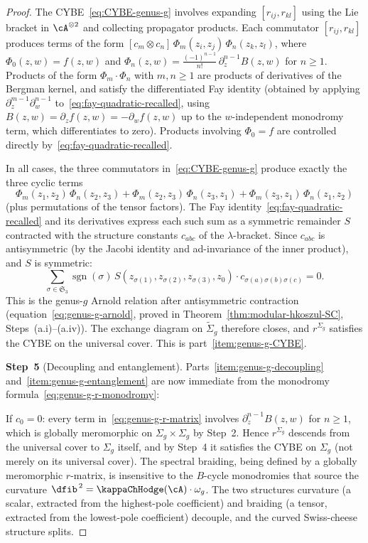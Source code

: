 \begin{proof}
The CYBE~\eqref{eq:CYBE-genus-g} involves expanding $[r_{ij},
r_{kl}]$ using the Lie bracket in $\cA^{\otimes 2}$ and collecting
propagator products. Each commutator $[r_{ij}, r_{kl}]$ produces
terms of the form
$[c_m \otimes c_n]\, \Phi_m(z_i, z_j)\, \Phi_n(z_k, z_l)$,
where $\Phi_0(z,w) = f(z,w)$ and
$\Phi_n(z,w) = \tfrac{(-1)^{n-1}}{n!}\, \partial_z^{n-1} B(z,w)$
for $n \ge 1$. Products of the form $\Phi_m \cdot \Phi_n$ with
$m, n \ge 1$ are products of derivatives of the Bergman kernel,
and satisfy the differentiated Fay identity (obtained by applying
$\partial_z^{m-1} \partial_w^{n-1}$ to~\eqref{eq:fay-quadratic-recalled},
using $B(z,w) = \partial_z f(z,w) = -\partial_w f(z,w)$ up to
the $w$-independent monodromy term, which differentiates to zero).
Products involving $\Phi_0 = f$ are controlled directly
by~\eqref{eq:fay-quadratic-recalled}.

In all cases, the three commutators
in~\eqref{eq:CYBE-genus-g} produce exactly the three cyclic terms
\[
\Phi_m(z_1, z_2)\, \Phi_n(z_2, z_3)
+ \Phi_m(z_2, z_3)\, \Phi_n(z_3, z_1)
+ \Phi_m(z_3, z_1)\, \Phi_n(z_1, z_2)
\]
(plus permutations of the tensor factors). The Fay
identity~\eqref{eq:fay-quadratic-recalled} and its derivatives
express each such sum as a symmetric remainder $S$ contracted
with the structure constants $c_{abc}$ of the $\lambda$-bracket.
Since $c_{abc}$ is antisymmetric (by the Jacobi identity and
ad-invariance of the inner product), and $S$ is symmetric:
\[
\sum_{\sigma \in \mathfrak{S}_3}
\operatorname{sgn}(\sigma)\,
S(z_{\sigma(1)}, z_{\sigma(2)}, z_{\sigma(3)}, z_0)
\cdot c_{\sigma(a)\sigma(b)\sigma(c)} = 0.
\]
This is the genus-$g$ Arnold relation after antisymmetric
contraction (equation~\eqref{eq:genus-g-arnold}, proved in
Theorem~\ref{thm:modular-hkoszul-SC}, Steps~(a.i)--(a.iv)).
The exchange diagram on $\widetilde{\Sigma}_g$
therefore closes, and $r^{\Sigma_g}$ satisfies the CYBE on the
universal cover. This is part~\ref{item:genus-g-CYBE}.

\medskip
\textbf{Step~5} (Decoupling and entanglement).
Parts~\ref{item:genus-g-decoupling}
and~\ref{item:genus-g-entanglement} are now immediate from
the monodromy formula~\eqref{eq:genus-g-r-monodromy}:

If $c_0 = 0$: every term in~\eqref{eq:genus-g-r-matrix}
involves $\partial_z^{n-1} B(z,w)$ for $n \ge 1$, which is
globally meromorphic on $\Sigma_g \times \Sigma_g$ by Step~2.
Hence $r^{\Sigma_g}$ descends from the universal cover to
$\Sigma_g$ itself, and by Step~4 it satisfies the CYBE on
$\Sigma_g$ (not merely on its universal cover).
The spectral braiding, being defined by a
globally meromorphic $r$-matrix, is insensitive to the $B$-cycle
monodromies that source the curvature
$\dfib^{\,2} = \kappaChHodge(\cA) \cdot \omega_g$. The two structures
curvature (a scalar, extracted from the highest-pole
coefficient) and braiding (a tensor, extracted from the
lowest-pole coefficient) decouple, and the curved
Swiss-cheese structure splits.


\end{proof}
